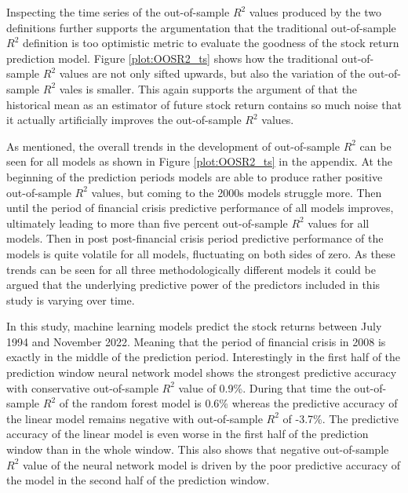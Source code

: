 \documentclass[12pt]{article}
\begin{document}
Inspecting the time series of the out-of-sample $R^2$ values produced by the two definitions further supports the argumentation that the traditional out-of-sample $R^2$ definition is too optimistic metric to evaluate the goodness of the stock return prediction model. Figure \ref{plot:OOSR2_ts} shows how the traditional out-of-sample $R^2$ values are not only sifted upwards, but also the variation of the out-of-sample $R^2$ vales is smaller. This again supports the argument of \citet{guetal} that the historical mean as an estimator of future stock return contains so much noise that it actually artificially improves the out-of-sample $R^2$ values. \par

As mentioned, the overall trends in the development of out-of-sample $R^2$ can be seen for all models as shown in Figure \ref{plot:OOSR2_ts} in the appendix. At the beginning of the prediction periods models are able to produce rather positive out-of-sample $R^2$ values, but coming to the 2000s models struggle more. Then until the period of financial crisis predictive performance of all models improves, ultimately leading to more than five percent out-of-sample $R^2$ values for all models. Then in post post-financial crisis period predictive performance of the models is quite volatile for all models, fluctuating on both sides of zero. As these trends can be seen for all three methodologically different models it could be argued that the underlying predictive power of the predictors included in this study is varying over time. \par

In this study, machine learning models predict the stock returns between July 1994 and November 2022. Meaning that the period of financial crisis in 2008 is exactly in the middle of the prediction period. Interestingly in the first half of the prediction window neural network model shows the strongest predictive accuracy with conservative out-of-sample $R^2$ value of 0.9\%. During that time the out-of-sample $R^2$ of the random forest model is 0.6\% whereas the predictive accuracy of the linear model remains negative with out-of-sample $R^2$ of -3.7\%. The predictive accuracy of the linear model is even worse in the first half of the prediction window than in the whole window. This also shows that negative out-of-sample $R^2$ value of the neural network model is driven by the poor predictive accuracy of the model in the second half of the prediction window. \par
\end{document}
